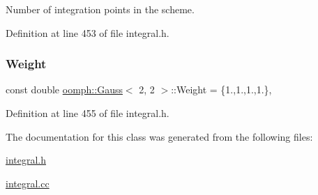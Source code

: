 Number of integration points in the scheme. 



Definition at line 453 of file integral.\+h.

\mbox{\label{classoomph_1_1Gauss_3_012_00_012_01_4_af87afb04f1bd14d9987fcfbc6424186e}} 
\subsubsection{\texorpdfstring{Weight}{Weight}}
{\footnotesize\ttfamily const double \hyperlink{classoomph_1_1Gauss}{oomph\+::\+Gauss}$<$ 2, 2 $>$\+::Weight = \{1.,1.,1.,1.\}\hspace{0.3cm}{\ttfamily [static]}, {\ttfamily [private]}}



Definition at line 455 of file integral.\+h.



The documentation for this class was generated from the following files\+:\begin{DoxyCompactItemize}
\item 
\hyperlink{integral_8h}{integral.\+h}\item 
\hyperlink{integral_8cc}{integral.\+cc}\end{DoxyCompactItemize}
